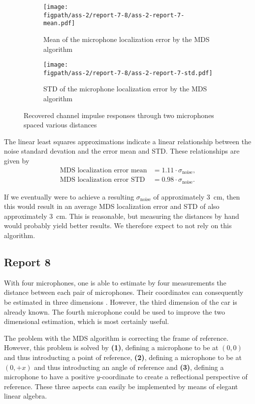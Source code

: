 \documentclass[11pt,titlepage]{report}
\newcommand{\figpath}{../../deliverable-7-resources/figures}
\begin{document}
\begin{figure}[H]
	\begin{subfigure}{.49\textwidth}
		\texttt{[image: \\figpath/ass-2/report-7-8/ass-2-report-7-mean.pdf]}
		\caption{\centering Mean of the microphone localization error by the MDS algorithm}
	\end{subfigure}
	\begin{subfigure}{.49\textwidth}
		\texttt{[image: \\figpath/ass-2/report-7-8/ass-2-report-7-std.pdf]}
		\caption{\centering STD of the microphone localization error by the MDS algorithm}
	\end{subfigure}
	\caption{Recovered channel impulse responses through two microphones spaced various distances}
	\label{fig:ass-2-rep-7}
\end{figure}

The linear least squares approximations indicate a linear relationship between the noise standard devation and the error mean and STD. These relationships are given by
\begin{align*}
	\text{MDS localization error mean}&=1.11 \cdot \sigma_{\text{noise}}, \\
	\text{MDS localization error STD}&=0.98 \cdot \sigma_{\text{noise}}.
\end{align*}

If we eventually were to achieve a resulting $\sigma_{\text{noise}}$ of approximately \SI{3}{cm}, then this would result in an average MDS localization error and STD of also approximately \SI{3}{cm}. This is reasonable, but measuring the distances by hand would probably yield better results. We therefore expect to not rely on this algorithm.

\subsection{Report 8}
With four microphones, one is able to estimate by four measurements the distance between each pair of microphones. Their coordinates can consequently be estimated in three dimensions \cite{shang-wheeler-mds}. However, the third dimension of the car is already known. The fourth microphone could be used to improve the two dimensional estimation, which is most certainly useful.

The problem with the MDS algorithm is correcting the frame of reference. However, this problem is solved by \textbf{(1)}, defining a microphone to be at $(0,0)$ and thus introducting a point of reference, \textbf{(2)}, defining a microphone to be at $(0,+x)$ and thus introducting an angle of reference and \textbf{(3)}, defining a microphone to have a positive $y$-coordinate to create a reflectional perspective of reference. These three aspects can easily be implemented by means of elegant linear algebra.
\end{document}
